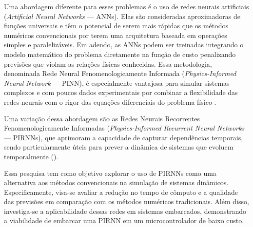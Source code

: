 Uma abordagem diferente para esses problemas é o uso de redes neurais artificiais (\textit{Artificial Neural Networks} — ANNs). Elas são consideradas aproximadoras de funções universais \citep{csaji_2001} e têm o potencial de serem mais rápidas que os métodos numéricos convencionais por terem uma arquitetura baseada em operações simples e paralelizáveis. Em adendo, as ANNs podem ser treinadas integrando o modelo matemático do problema diretamente na função de custo penalizando previsões que violam as relações físicas conhecidas. Essa metodologia, denominada Rede Neural Fenomenologicamente Informada (\textit{Physics-Informed Neural Network} — PINN), é especialmente vantajosa para simular sistemas complexos e com poucos dados experimentais por combinar a flexibilidade das redes neurais com o rigor das equações diferenciais do problema físico \citep{raissi_2019}.

Uma variação dessa abordagem são as Redes Neurais Recorrentes Fenomenologicamente Informadas (\textit{Physics-Informed Recurrent Neural Networks} — PIRNNs), que aprimoram a capacidade de capturar dependências temporais, sendo particularmente úteis para prever a dinâmica de sistemas que evoluem temporalmente (\citep{zheng_2023}).

Essa pesquisa tem como objetivo explorar o uso de PIRNNs como uma alternativa aos métodos convencionais na simulação de sistemas dinâmicos. Especificamente, visa-se avaliar a redução no tempo de cômputo e a qualidade das previsões em comparação com os métodos numéricos tradicionais. Além disso, investiga-se a aplicabilidade dessas redes em sistemas embarcados, demonstrando a viabilidade de embarcar uma PIRNN em um microcontrolador de baixo custo.
